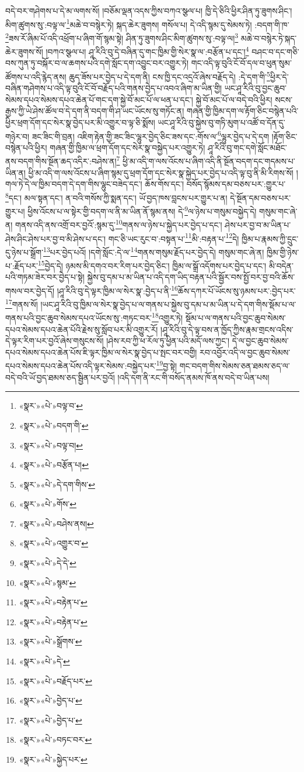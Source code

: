 བདེ་བར་གཤེགས་པ་དེ་མ་ལགས་སོ། །བཅོམ་ལྡན་འདས་ཀྱིས་བཀའ་སྩལ་པ། ཁྱི་དེ་ཅིའི་ཕྱིར་ཤིན་ཏུ་ཟུགས་ཤིང་། མིག་ཚུགས་སུ་:བལྟ་ལ་\footnote{«སྣར་»«པེ་»བལྟ་བ་}མཆེ་བ་བསྙེར་ཏེ། སྐད་ཆེར་ཟུགས། གསོལ་པ། དེ་འདི་སྙམ་དུ་སེམས་ཏེ། :བདག་གི་ཁ་\footnote{«སྣར་»«པེ་»བདག་གི་}ཟས་རོ་ཞིམ་པོ་འདི་འཕྲོག་པ་ཞིག་གོ་སྙམ་སྟེ། ཤིན་ཏུ་ཟུགས་ཤིང་མིག་ཚུགས་སུ་:བལྟ་ལ།\footnote{«སྣར་»«པེ་»བལྟ་བ།} མཆེ་བ་བསྙེར་ཏེ་སྐད་ཆེར་ཟུགས་སོ། །བཀའ་སྩལ་པ། ཤཱ་རིའི་བུ་དེ་བཞིན་དུ་གང་ཁྱིམ་གྱི་སེར་སྣ་ལ་:བརྩོན་པ་དང་།\footnote{«སྣར་»«པེ་»བརྩོན་པ།} བཤང་བ་དང་གཅི་བས་ཀུན་ཏུ་བསྐོར་བ་ལ་ཆགས་པའི་དགེ་སློང་དག་འབྱུང་བར་འགྱུར་ཏེ། གང་འདི་ལྟ་བུའི་ངོ་བོ་དལ་བ་ཕུན་སུམ་ཚོགས་པ་འདི་རྙེད་ནས། ཆུད་ཟོས་པར་བྱེད་པ་དེ་དག་ནི། ངས་ཁྱི་དང་འདྲའོ་ཞེས་བརྗོད་དེ། :དེ་དག་གི་\footnote{«སྣར་»«པེ་»དེ་དག་གིས་}ཕྱིར་དེ་བཞིན་གཤེགས་པ་འདི་ལྟ་བུའི་ངོ་བོ་བརྗོད་པའི་གནས་བྱེད་པ་འབའ་ཞིག་མ་ཡིན་གྱི། ཡང་ཤཱ་རིའི་བུ་བྱང་ཆུབ་སེམས་དཔའ་སེམས་དཔའ་ཆེན་པོ་གང་དག་སྐྱེ་བོ་མང་པོ་ལ་ཕན་པ་དང་། སྐྱེ་བོ་མང་པོ་ལ་བདེ་བའི་ཕྱིར། སངས་རྒྱས་ཀྱི་ཡེ་ཤེས་ཚོལ་བ་དེ་དག་ནི་བདག་གི་ཤ་ཡང་ཡོངས་སུ་གཏོང་ན། གཞན་གྱི་ཁྱིམ་དག་ལ་རྟོག་ཅིང་བསྙེན་པའི་ཕྱིར་ཕྲག་དོག་དང་སེར་སྣ་བྱེད་པར་མི་འགྱུར་བ་ལྟ་ཅི་སྨོས། ཡང་ཤཱ་རིའི་བུ་སྐྱེས་བུ་གཏི་མུག་པ་འཚོ་བ་དོན་དུ་གཉེར་བ། ཟང་ཟིང་གི་བྲན། འཇིག་རྟེན་གྱི་ཟང་ཟིང་ལྷུར་བྱེད་ཅིང་ཟས་དང་:གོས་ལ་\footnote{«སྣར་»«པེ་»གོས་}ལྷུར་བྱེད་པ་དེ་དག །རྟོག་ཅིང་བསྙེན་པའི་ཕྱིར། གཞན་གྱི་ཁྱིམ་ལ་ཕྲག་དོག་དང་སེར་སྣ་བསྐྱེད་པར་འགྱུར་ཏེ། ཤཱ་རིའི་བུ་གང་དགེ་སློང་མཐོང་ནས་བདག་གིས་སྔོན་ཆད་འདིར་:བཤེས་ན།\footnote{«སྣར་»«པེ་»བཤེས་ནས།} ཕྱི་མ་འདི་ག་ལས་འོངས་པ་ཞིག་འདི་ནི་སྔོན་བདག་དང་གདམས་པ་ཡིན་ན། ཕྱི་མ་འདི་ག་ལས་འོངས་པ་ཞིག་སྙམ་དུ་ཕྲག་དོག་དང་སེར་སྣ་སྐྱེད་པར་བྱེད་པ་འདི་ལྟ་བུ་ནི་མི་རིགས་སོ། །གལ་ཏེ་དེ་ལ་ཁྱིམ་བདག་དེ་དག་གིས་ལྷུང་བཟེད་དང་། ཆོས་གོས་དང་། བསོད་སྙོམས་དམ་བཅས་པར་:གྱུར་པ་\footnote{«སྣར་»«པེ་»འགྱུར་བ་}དང་། མལ་སྟན་དང་། ན་བའི་གསོས་ཀྱི་སྨན་དང་། ཡོ་བྱད་ཁས་བླངས་པར་གྱུར་པ་ན། དེ་སྔོན་དམ་བཅས་པར་གྱུར་པ། ཕྱིས་འོངས་པ་ལ་སྟེར་གྱི་བདག་ལ་ནི་མ་ཡིན་ནོ་སྙམ་ནས། དེ་\footnote{«སྣར་»«པེ་»དེ་དེ་}ལ་ཉེས་པ་གསུམ་བསྐྱེད་དེ། གསུམ་གང་ཞེ་ན། གནས་འདི་ནས་འགྲོ་བར་བྱའོ་:སྙམ་དུ་\footnote{«སྣར་»«པེ་»སྙམ་}གནས་ལ་ཉེས་པ་སྐྱེད་པར་བྱེད་པ་དང་། ཤེས་པར་བྱ་བ་མ་ཡིན་པ་ཤེས་ཤིང་ཤེས་པར་བྱ་བ་མི་ཤེས་པ་དང་། གང་ཅི་ཡང་རུང་བ་:བསྟན་པ་\footnote{«སྣར་»«པེ་»བརྟེན་པ་}མི་:བརྟན་པ་\footnote{«སྣར་»«པེ་»བརྟེན་པ་}དེ། ཁྱིམ་པ་རྣམས་ཀྱི་དྲུང་དུ་ཉེས་པ་སྒྲོག་\footnote{«སྣར་»«པེ་»སྒྲོགས་}པར་བྱེད་པའོ། །དགེ་སློང་:དེ་ལ་\footnote{«སྣར་»«པེ་»དེ་}གནས་གསུམ་རྗོད་པར་བྱེད་དེ། གསུམ་གང་ཞེ་ན། ཁྱིམ་གྱི་ཉེས་པ་:རྗོད་པར་\footnote{«སྣར་»«པེ་»བརྗོད་པར་}བྱེད་དེ། ཉམས་མི་དགའ་བར་རིག་པར་བྱེད་ཅིང་། ཁྱིམ་ལ་སྒྲོ་འདོགས་པར་བྱེད་པ་དང་། མི་བདེན་པའི་གཏམ་ཟེར་བར་བྱེད་པ་སྟེ། སྐྱེས་བུ་དམ་པ་མ་ཡིན་པ་འདི་དག་ཡིད་བརྟན་པའི་སྦྱོར་བས་སྤྱོ་བར་བྱ་བའི་ཆོས་གསལ་བར་བྱེད་དོ། །ཤཱ་རིའི་བུ་དེ་ལྟར་ཁྱིམ་ལ་སེར་སྣ་:བྱེད་པ་ནི་\footnote{«སྣར་»«པེ་»བྱེད་པ་}ཆོས་དཀར་པོ་ཡོངས་སུ་ཉམས་པར་:བྱེད་པར་\footnote{«སྣར་»«པེ་»བྱེད་པ་}གནས་སོ། །ཡང་ཤཱ་རིའི་བུ་ཁྱིམ་ལ་སེར་སྣ་བྱེད་པ་ལ་གནས་པ་སྐྱེས་བུ་དམ་པ་མ་ཡིན་པ་དེ་དག་གིས་སྡོམ་པ་ལ་གནས་པའི་བྱང་ཆུབ་སེམས་དཔའ་ཡོངས་སུ་:གཏང་བར་\footnote{«སྣར་»«པེ་»བཏང་བར་}འགྱུར་ཏེ། སྡོམ་པ་ལ་གནས་པའི་བྱང་ཆུབ་སེམས་དཔའ་སེམས་དཔའ་ཆེན་པོའི་རྗེས་སུ་སློབ་པར་མི་འགྱུར་རོ། །ཤཱ་རིའི་བུ་དེ་ལྟ་བས་ན་ཁྱོད་ཀྱིས་རྣམ་གྲངས་འདིས་དེ་ལྟར་རིག་པར་བྱའོ་ཞེས་གསུངས་སོ། །ཤེས་རབ་ཀྱི་ཕ་རོལ་ཏུ་ཕྱིན་པའི་མདོ་ལས་ཀྱང་། དེ་ལ་བྱང་ཆུབ་སེམས་དཔའ་སེམས་དཔའ་ཆེན་པོས་ཇི་ལྟར་ཁྱིམ་ལ་སེར་སྣ་བྱེད་པ་སྤང་བར་བགྱི། རབ་འབྱོར་འདི་ལ་བྱང་ཆུབ་སེམས་དཔའ་སེམས་དཔའ་ཆེན་པོས་འདི་ལྟར་སེམས་:བསྐྱེད་པར་\footnote{«སྣར་»«པེ་»སྐྱེད་པར་}བྱ་སྟེ། གང་བདག་གིས་སེམས་ཅན་ཐམས་ཅད་ལ་བདེ་བའི་ཡོ་བྱད་ཐམས་ཅད་སྦྱིན་པར་བྱའོ། །འདི་དག་ནི་རང་གི་བསོད་ནམས་ཁོ་ནས་བདེ་བ་ཡིན་པས། 